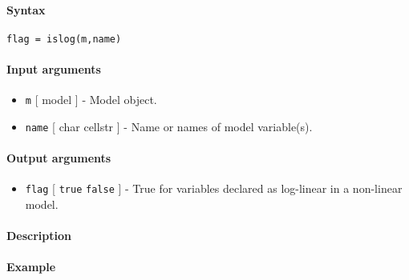 


	\paragraph{Syntax}\label{syntax}

\begin{verbatim}
flag = islog(m,name)
\end{verbatim}

\paragraph{Input arguments}\label{input-arguments}

\begin{itemize}
\item
  \texttt{m} {[} model {]} - Model object.
\item
  \texttt{name} {[} char \textbar{} cellstr {]} - Name or names of model
  variable(s).
\end{itemize}

\paragraph{Output arguments}\label{output-arguments}

\begin{itemize}
\itemsep1pt\parskip0pt
\item
  \texttt{flag} {[} \texttt{true} \textbar{} \texttt{false} {]} - True
  for variables declared as log-linear in a non-linear model.
\end{itemize}

\paragraph{Description}\label{description}

\paragraph{Example}\label{example}


